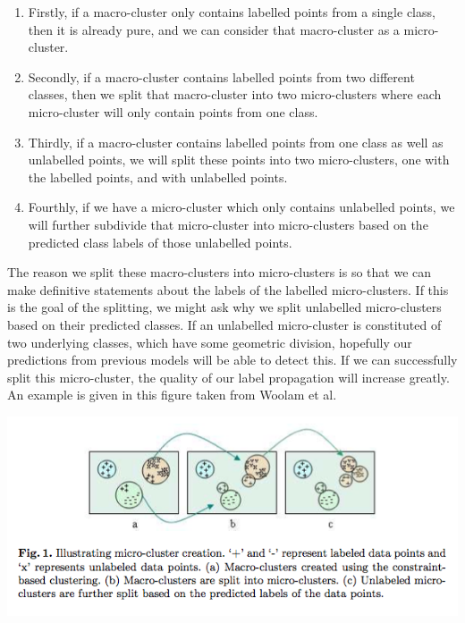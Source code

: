 \documentclass[12pt,a4paper,oneside]{report}
\begin{document}
\begin{enumerate}
\item Firstly, if a macro-cluster only contains labelled points from a single class, then it is already pure, and we can consider that macro-cluster as a micro-cluster. 
\item Secondly, if a macro-cluster contains labelled points from two different classes, then we split that macro-cluster into two micro-clusters where each micro-cluster will only contain points from one class. 
\item Thirdly, if a macro-cluster contains labelled points from one class as well as unlabelled points, we will split these points into two micro-clusters, one with the labelled points, and with unlabelled points. 
\item Fourthly, if we have a micro-cluster which only contains unlabelled points, we will further subdivide that micro-cluster into micro-clusters based on the predicted class labels of those unlabelled points.  
\end{enumerate}

The reason we split these macro-clusters into micro-clusters is so that we can make definitive statements about the labels of the labelled micro-clusters. If this is the goal of the splitting, we might ask why we split unlabelled micro-clusters based on their predicted classes. If an unlabelled micro-cluster is constituted of two underlying classes, which have some geometric division, hopefully our predictions from previous models will be able to detect this. If we can successfully split this micro-cluster, the quality of our label propagation will increase greatly. An example is given in this figure taken from Woolam et al.\cite{LabStr}

\includegraphics[scale = 0.7]{ClusterSplitting}
\end{document}
